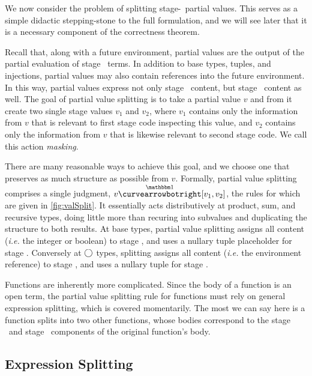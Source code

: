 We now consider the problem of splitting stage-\bbone\ partial values.
This serves as a simple didactic stepping-stone to the full formulation, 
and we will see later that it is a necessary component of the correctness theorem.

Recall that, along with a future environment, partial values are the output of the partial evaluation of stage \bbone\ terms.
In addition to base types, tuples, and injections, partial values may also contain references into the future environment.
In this way, partial values express not only stage \bbone\ content, but stage \bbtwo\ content as well.
The goal of partial value splitting is to take a partial value $v$ and from it create two single stage values $v_1$ and $v_2$,
where $v_1$ contains only the information from $v$ that is relevant to first stage code inspecting this value, 
and $v_2$ contains only the information from $v$ that is likewise relevant to second stage code.
We call this action {\em masking}.

  There are many reasonable ways to achieve this goal, and
we choose one that preserves as much structure as possible from $v$.
Formally, partial value splitting comprises a single judgment, $v
\vsplito [v_1,v_2]$, the rules for which are given in
\cref{fig:valSplit}.  It essentially acts distributively at product,
sum, and recursive types, doing little more than recuring into
subvalues and duplicating the structure to both results.  At base
types, partial value splitting assigns all content ({\em i.e.} the
integer or boolean) to stage \bbone, and uses a nullary tuple
placeholder for stage \bbtwo.  Conversely at $\bigcirc$ types, splitting
assigns all content ({\em i.e.} the environment reference) to stage
\bbtwo, and uses a nullary tuple for stage \bbone.


Functions are inherently more complicated.  Since the body of a
function is an open term, the partial value splitting rule for
functions must rely on general expression splitting, which is covered
momentarily.  The most we can say here is a function splits into two
other functions, whose bodies correspond to the stage \bbone\ and
stage \bbtwo\ components of the original function's body.

\subsection{Expression Splitting}

